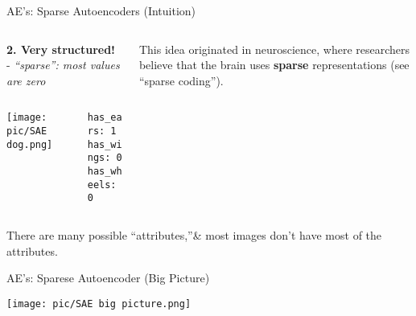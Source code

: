\documentclass[serif, aspectratio=169]{beamer}
\begin{document}
\begin{frame}{AE’s: Sparse Autoencoders (Intuition)}
\begin{columns}[t]
\begin{column}{0.7\textwidth}
            \textbf{\textcolor{deepgreen}{2. Very structured!}} - \textit{“sparse”: most values are zero}
            \begin{tcolorbox}[colback=white!10, colframe=white, boxrule=0.5pt, width=0.7\textwidth]
                \begin{columns}[T]
                    \begin{column}{0.3\textwidth}
                        \texttt{[image: pic/SAE dog.png]} 
                    \end{column}
                    \begin{column}{0.75\textwidth}
                        \scriptsize{\texttt{has\_ears: 1 \\
                        has\_wings: 0 \\
                        has\_wheels: 0}} \\
                    \end{column}
                \end{columns}
            \end{tcolorbox}
            
 
        \end{column}
        
        \begin{column}{0.4\textwidth}
        \vspace{-1.3cm}

            \begin{tcolorbox}[colback=blue!5, colframe=blue!70!black, boxrule=0.5pt, width=\textwidth, title=\textbf{Aside:}]
                \scriptsize{This idea originated in neuroscience, where researchers believe that the brain uses \textbf{sparse} representations (see “sparse coding”).}
            \end{tcolorbox}
        \end{column}
        
    \end{columns}
        \vspace{0.2cm}
       \scriptsize{There are many possible “attributes,”\& most images don’t have most of the attributes.}

\end{frame}


\begin{frame}{AE's: Sparese Autoencoder (Big Picture)}
    \begin{center}
        \texttt{[image: pic/SAE big picture.png]}
    \end{center}

\end{frame}
\end{document}

